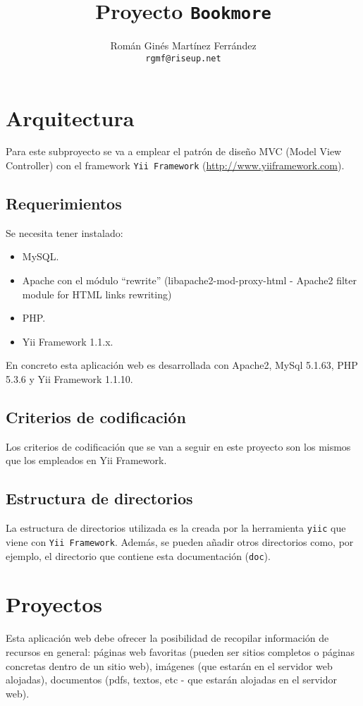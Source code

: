 \documentclass[12pt,twoside,a4paper]{article}
\title{Proyecto \texttt{Bookmore}}
\author{Román Ginés Martínez Ferrández \\ \texttt{rgmf@riseup.net}}
\begin{document}
\maketitle
\thispagestyle{fancy} %
\tableofcontents

\section{Arquitectura}
Para este subproyecto se va a emplear el patrón de diseño MVC (Model View Controller) con el framework \texttt{Yii Framework} (\url{http://www.yiiframework.com}).

\subsection{Requerimientos}
Se necesita tener instalado:
\begin{itemize}
\item MySQL.
\item Apache con el módulo ``rewrite'' (libapache2-mod-proxy-html - Apache2 filter module for HTML links rewriting)
\item PHP.
\item Yii Framework 1.1.x.
\end{itemize}

En concreto esta aplicación web es desarrollada con Apache2, MySql 5.1.63, PHP 5.3.6 y Yii Framework 1.1.10.

\subsection{Criterios de codificación}
Los criterios de codificación que se van a seguir en este proyecto son los mismos que los empleados en Yii Framework.

\subsection{Estructura de directorios}
La estructura de directorios utilizada es la creada por la herramienta \texttt{yiic} que viene con \texttt{Yii Framework}. Además, se pueden añadir otros directorios como, por ejemplo, el directorio que contiene esta documentación (\texttt{doc}).

\section{Proyectos}
Esta aplicación web debe ofrecer la posibilidad de recopilar información de recursos en general: páginas web favoritas (pueden ser sitios completos o páginas concretas dentro de un sitio web), imágenes (que estarán en el servidor web alojadas), documentos (pdfs, textos, etc - que estarán alojadas en el servidor web).
\end{document}

